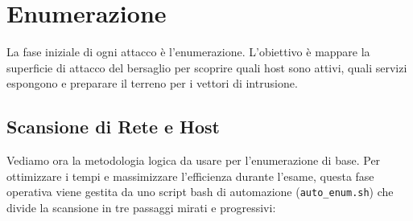 \documentclass[12pt,a4paper]{report}
\begin{document}
	\chapter{Enumerazione}
	
	La fase iniziale di ogni attacco è l'enumerazione. L'obiettivo è mappare la superficie di attacco del bersaglio per scoprire quali host sono attivi, quali servizi espongono e preparare il terreno per i vettori di intrusione. 
	
	\section{Scansione di Rete e Host}
	
	Vediamo ora la metodologia logica da usare per l'enumerazione di base. Per ottimizzare i tempi e massimizzare l'efficienza durante l'esame, questa fase operativa viene gestita da uno script bash di automazione (\texttt{auto\_enum.sh}) che divide la scansione in tre passaggi mirati e progressivi:
	
\end{document}
